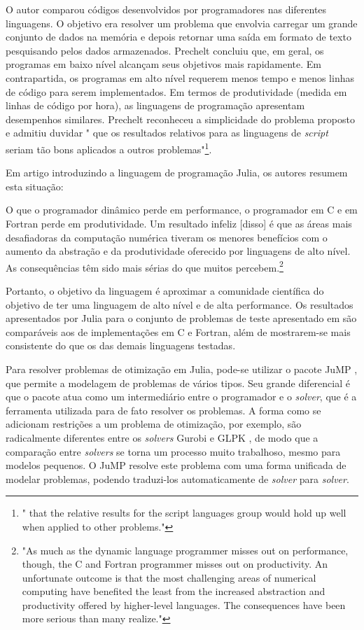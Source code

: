 O autor comparou códigos desenvolvidos por programadores nas diferentes linguagens. O objetivo era resolver um problema que envolvia carregar um grande conjunto de dados na memória e depois retornar uma saída em formato de texto pesquisando pelos dados armazenados. Prechelt concluiu que, em geral, os programas em baixo nível alcançam seus objetivos mais rapidamente. Em contrapartida, os programas em alto nível requerem menos tempo e menos linhas de código para serem implementados. Em termos de produtividade (medida em linhas de código por hora), as linguagens de programação apresentam desempenhos similares. Prechelt reconheceu a simplicidade do problema proposto e admitiu duvidar "\textelp{} que os resultados relativos para as linguagens de \emph{script} seriam tão bons aplicados a outros problemas"\footnote{"\textelp{} that the relative results for the script languages group would hold up well when applied to other problems."}.

Em artigo introduzindo a linguagem de programação Julia, os autores \textcite{JULIA} resumem esta situação:

\begin{displayquote}
    O que o programador dinâmico perde em performance, o programador em C e em Fortran perde em produtividade. Um resultado infeliz [disso] é que as áreas mais desafiadoras da computação numérica tiveram os menores benefícios com o aumento da abstração e da produtividade oferecido por linguagens de alto nível. As consequências têm sido mais sérias do que muitos percebem.\footnote{"As much as the dynamic language programmer misses out on performance, though, the C and Fortran programmer misses out on productivity. An unfortunate outcome is that the most challenging areas of numerical computing have benefited the least from the increased abstraction and productivity offered by higher-level languages. The consequences have been more serious than many realize."}
\end{displayquote}

Portanto, o objetivo da linguagem é aproximar a comunidade científica do objetivo de ter uma linguagem de alto nível e de alta performance. Os resultados apresentados por Julia para o conjunto de problemas de teste apresentado em \cite{JULIA} são comparáveis aos de implementações em C e Fortran, além de mostrarem-se mais consistente do que os das demais linguagens testadas.

Para resolver problemas de otimização em Julia, pode-se utilizar o pacote JuMP \cite{JuMP}, que permite a modelagem de problemas de vários tipos. Seu grande diferencial é que o pacote atua como um intermediário entre o programador e o \emph{solver}, que é a ferramenta utilizada para de fato resolver os problemas. A forma como se adicionam restrições a um problema de otimização, por exemplo, são radicalmente diferentes entre os \emph{solvers} Gurobi \cite{GUROBI:22} e GLPK \cite{GLPK}, de modo que a comparação entre \emph{solvers} se torna um processo muito trabalhoso, mesmo para modelos pequenos. O JuMP resolve este problema com uma forma unificada de modelar problemas, podendo traduzi-los automaticamente de \emph{solver} para \emph{solver}.

